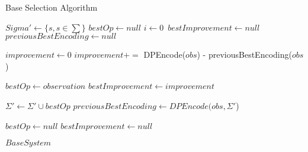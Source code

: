 \begin{algorithm}
\caption{Base Selection Algorithm}
\label{Base Selection}
\begin{algorithmic}[1]
\State $Sigma' \gets \{s, s \in \sum \}$
\State $bestOp \gets null$
\State $i\gets 0$\
\State $bestImprovement \gets null$
\State $previousBestEncoding \gets null$

		\State $improvement \gets 0$
			$improvement +=$ DPEncode($obs$) - previousBestEncoding($obs$)
		\EndFor
		
			\State $bestOp \gets observation$
			\State $bestImprovement \gets improvement$
		\EndIf
		
	
		
	\EndFor

	\State $\Sigma' \gets \Sigma' \cup bestOp$
		$previousBestEncoding \gets DPEncode(obs,\Sigma'$) 
	\EndFor	
	
	\State $bestOp \gets null$
	\State $bestImprovement \gets null$

\EndWhile
\Return $BaseSystem$

\EndProcedure
\end{algorithmic}
\end{algorithm}

